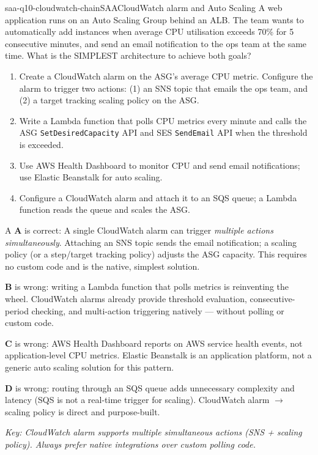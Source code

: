 \begin{question}{saa-q10-cloudwatch-chain}{SAA}{CloudWatch alarm and Auto Scaling}
A web application runs on an Auto Scaling Group behind an ALB. The team wants to automatically add instances when average CPU utilisation exceeds 70\% for 5 consecutive minutes, and send an email notification to the ops team at the same time. What is the SIMPLEST architecture to achieve both goals?

\begin{enumerate}[label=\Alph*.]
  \item Create a CloudWatch alarm on the ASG's average CPU metric. Configure the alarm to trigger two actions: (1) an SNS topic that emails the ops team, and (2) a target tracking scaling policy on the ASG.
  \item Write a Lambda function that polls CPU metrics every minute and calls the ASG \texttt{SetDesiredCapacity} API and SES \texttt{SendEmail} API when the threshold is exceeded.
  \item Use AWS Health Dashboard to monitor CPU and send email notifications; use Elastic Beanstalk for auto scaling.
  \item Configure a CloudWatch alarm and attach it to an SQS queue; a Lambda function reads the queue and scales the ASG.
\end{enumerate}
\end{question}

\begin{answer}{A}
\textbf{A} is correct: A single CloudWatch alarm can trigger \emph{multiple actions simultaneously}. Attaching an SNS topic sends the email notification; a scaling policy (or a step/target tracking policy) adjusts the ASG capacity. This requires no custom code and is the native, simplest solution.

\textbf{B} is wrong: writing a Lambda function that polls metrics is reinventing the wheel. CloudWatch alarms already provide threshold evaluation, consecutive-period checking, and multi-action triggering natively --- without polling or custom code.

\textbf{C} is wrong: AWS Health Dashboard reports on AWS service health events, not application-level CPU metrics. Elastic Beanstalk is an application platform, not a generic auto scaling solution for this pattern.

\textbf{D} is wrong: routing through an SQS queue adds unnecessary complexity and latency (SQS is not a real-time trigger for scaling). CloudWatch alarm $\rightarrow$ scaling policy is direct and purpose-built.

\textit{Key: CloudWatch alarm supports multiple simultaneous actions (SNS + scaling policy). Always prefer native integrations over custom polling code.}
\end{answer}

